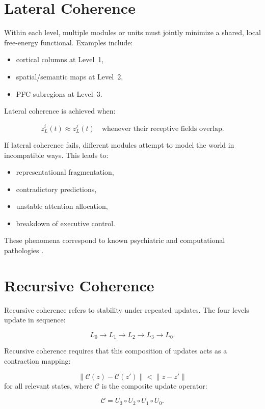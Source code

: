 \documentclass[12pt,oneside]{book}
\theoremstyle{plain}
\theoremstyle{definition}
\let\citep\parencite
\begin{document}
\section{Lateral Coherence}

Within each level, multiple modules or units must jointly minimize a shared,
local free-energy functional.
Examples include:

\begin{itemize}
    \item cortical columns at Level~1,
    \item spatial/semantic maps at Level~2,
    \item PFC subregions at Level~3.
\end{itemize}

Lateral coherence is achieved when:

\[
z^i_L(t) \approx z^j_L(t)
\quad \text{whenever their receptive fields overlap}.
\]

If lateral coherence fails, different modules attempt to model the world
in incompatible ways.
This leads to:

\begin{itemize}
    \item representational fragmentation,
    \item contradictory predictions,
    \item unstable attention allocation,
    \item breakdown of executive control.
\end{itemize}

These phenomena correspond to known psychiatric and computational pathologies
\citep{montague2012computational,corlett2016prediction}.

\section{Recursive Coherence}

Recursive coherence refers to stability under repeated updates.
The four levels update in sequence:

\[
L_0 \rightarrow L_1 \rightarrow L_2 \rightarrow L_3 \rightarrow L_0.
\]

Recursive coherence requires that this composition of updates acts as a
contraction mapping:

\[
\| \mathcal{C}(z) - \mathcal{C}(z') \|
<
\| z - z' \|
\]
for all relevant states, where $\mathcal{C}$ is the composite update operator:

\[
\mathcal{C} = U_3 \circ U_2 \circ U_1 \circ U_0.
\]
\end{document}
